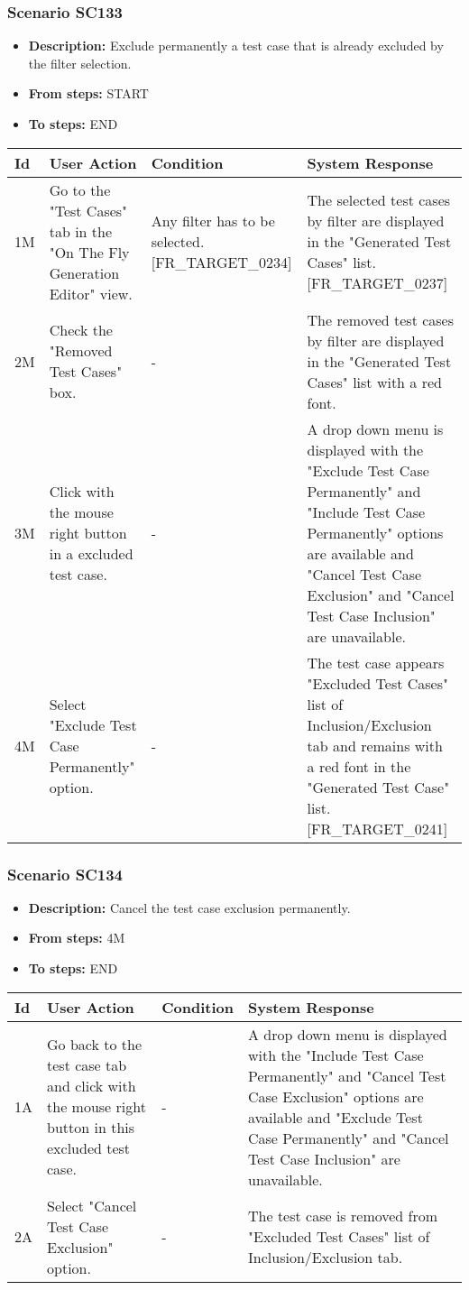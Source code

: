 \documentclass[a4paper,11pt]{article}
\newcommand{\bl}{\\ \hline}
\begin{document}
\subsubsection*{Scenario SC133}
\begin{itemize}
\item {\bf Description:} Exclude permanently a test case that is already
					excluded by the filter selection.
\item {\bf From steps:} START
\item {\bf To steps:} END
\end{itemize}
\begin{tabular}{|p{0.4in}|p{1.5in}|p{1.5in}|p{1.5in}|}
\hline
Id & User Action & Condition & System Response \bl 
1M & Go to the "Test Cases" tab in the "On The Fly Generation
						Editor" view. & Any filter has to be selected. [FR_TARGET_0234]
					 & The selected test cases by filter are displayed in the
						"Generated Test Cases" list. [FR_TARGET_0237]\bl
2M & Check the "Removed Test Cases" box. & - & The removed test cases by filter are displayed in the
						"Generated Test Cases" list with a red font.\bl
3M & Click with the mouse right button in a excluded test case.
					 & - & A drop down menu is displayed with the "Exclude Test Case
						Permanently" and "Include Test Case Permanently" options are
						available and "Cancel Test Case Exclusion" and "Cancel Test Case
						Inclusion" are unavailable.\bl
4M & Select "Exclude Test Case Permanently" option. & - & The test case appears "Excluded Test Cases" list of
						Inclusion/Exclusion tab and remains with a red font in the
						"Generated Test Case" list. [FR_TARGET_0241]\bl
\end{tabular}
\subsubsection*{Scenario SC134}
\begin{itemize}
\item {\bf Description:} Cancel the test case exclusion permanently.
				
\item {\bf From steps:} 4M
\item {\bf To steps:} END
\end{itemize}
\begin{tabular}{|p{0.4in}|p{1.5in}|p{1.5in}|p{1.5in}|}
\hline
Id & User Action & Condition & System Response \bl 
1A & Go back to the test case tab and click with the mouse right
						button in this excluded test case. & - & A drop down menu is displayed with the "Include Test Case
						Permanently" and "Cancel Test Case Exclusion" options are
						available and "Exclude Test Case Permanently" and "Cancel Test
						Case Inclusion" are unavailable.\bl
2A & Select "Cancel Test Case Exclusion" option. & - & The test case is removed from "Excluded Test Cases" list
						of Inclusion/Exclusion tab.\bl
\end{tabular}
\end{document}

